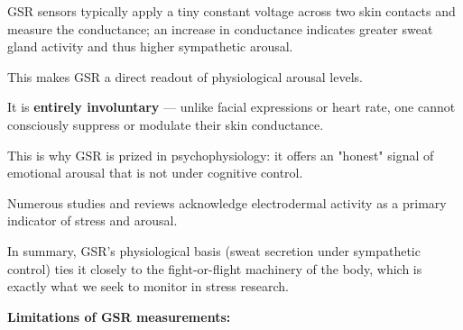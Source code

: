 GSR sensors typically apply a tiny constant voltage across two skin contacts and measure the conductance; an increase in conductance indicates greater sweat gland activity and thus higher sympathetic arousal.

This makes GSR a direct readout of physiological arousal levels.

It is \textbf{entirely involuntary}
 --- unlike facial expressions or heart rate, one cannot consciously suppress or modulate their skin conductance.

This is why GSR is prized in psychophysiology: it offers an "honest" signal of emotional arousal that is not under cognitive control.

Numerous studies and reviews acknowledge electrodermal activity as a primary indicator of stress and arousal.

In summary, GSR's physiological basis (sweat secretion under sympathetic control) ties it closely to the fight-or-flight machinery of the body, which is exactly what we seek to monitor in stress research.

\textbf{Limitations of GSR measurements:}

